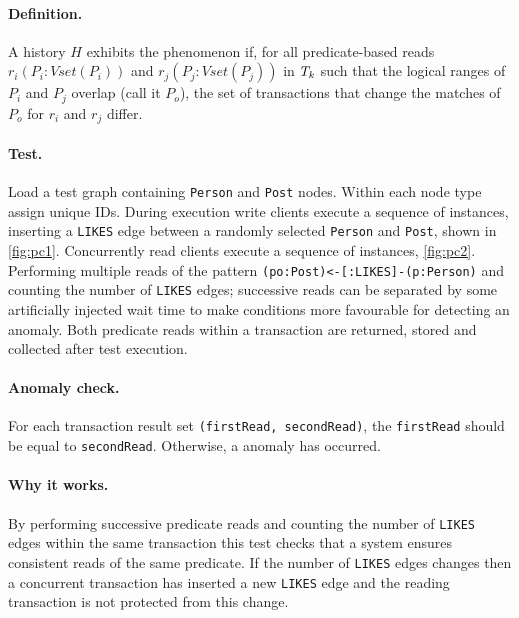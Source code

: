 \paragraph{Definition.}
A history $H$ exhibits the phenomenon  if, for all predicate-based reads $r_i(P_i : \textit{Vset}(P_i))$ and $r_j(P_j : \textit{Vset}(P_j))$ in $T_k$ such that the logical ranges of $P_i$ and $P_j$ overlap (call it $P_o$), the set of transactions that change the matches of $P_o$ for $r_i$ and $r_j$ differ.

\paragraph{Test.}
Load a test graph containing \texttt{Person} and \texttt{Post} nodes.
Within each node type assign unique IDs.
During execution write clients execute a sequence of  instances, inserting a \texttt{LIKES} edge between a randomly selected \texttt{Person} and \texttt{Post}, shown in \autoref{fig:pc1}.
Concurrently read clients execute a sequence of  instances, \autoref{fig:pc2}.
Performing multiple reads of the pattern \texttt{(po:Post)<-[:LIKES]-(p:Person)} and counting the number of \texttt{LIKES} edges; successive reads can be separated by some artificially injected wait time to make conditions more favourable for detecting an anomaly.
Both predicate reads within a  transaction are returned, stored and collected after test execution.

\paragraph{Anomaly check.}
For each  transaction result set \texttt{(firstRead, secondRead)}, the \texttt{firstRead} should be equal to \texttt{secondRead}.
Otherwise, a  anomaly has occurred.

\paragraph{Why it works.}
By performing successive predicate reads and counting the number of \texttt{LIKES} edges within the same transaction this test checks that a system ensures consistent reads of the same predicate.
If the number of \texttt{LIKES} edges changes then a concurrent transaction has inserted a new \texttt{LIKES} edge and the reading transaction is not protected from this change.

